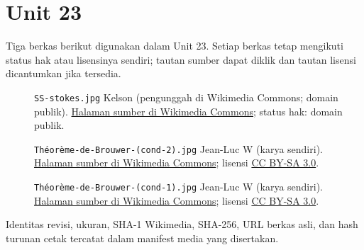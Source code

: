 \section*{Unit 23}
Tiga berkas berikut digunakan dalam Unit 23. Setiap berkas tetap mengikuti status hak atau lisensinya sendiri; tautan sumber dapat diklik dan tautan lisensi dicantumkan jika tersedia.
\begin{description}
\item[]\texttt{SS-stokes.jpg}
Kelson (pengunggah di Wikimedia Commons; domain publik).
\href{https://commons.wikimedia.org/wiki/File:SS-stokes.jpg}{Halaman sumber di Wikimedia Commons}; status hak: domain publik.
\item[]\texttt{Théorème-de-Brouwer-(cond-2).jpg}
Jean-Luc W (karya sendiri).
\href{https://commons.wikimedia.org/wiki/File:Th%C3%A9or%C3%A8me-de-Brouwer-(cond-2).jpg}{Halaman sumber di Wikimedia Commons}; lisensi \href{https://creativecommons.org/licenses/by-sa/3.0/}{CC BY-SA 3.0}.
\item[]\texttt{Théorème-de-Brouwer-(cond-1).jpg}
Jean-Luc W (karya sendiri).
\href{https://commons.wikimedia.org/wiki/File:Th%C3%A9or%C3%A8me-de-Brouwer-(cond-1).jpg}{Halaman sumber di Wikimedia Commons}; lisensi \href{https://creativecommons.org/licenses/by-sa/3.0/}{CC BY-SA 3.0}.
\end{description}
Identitas revisi, ukuran, SHA-1 Wikimedia, SHA-256, URL berkas asli, dan hash turunan cetak tercatat dalam manifest media yang disertakan.
